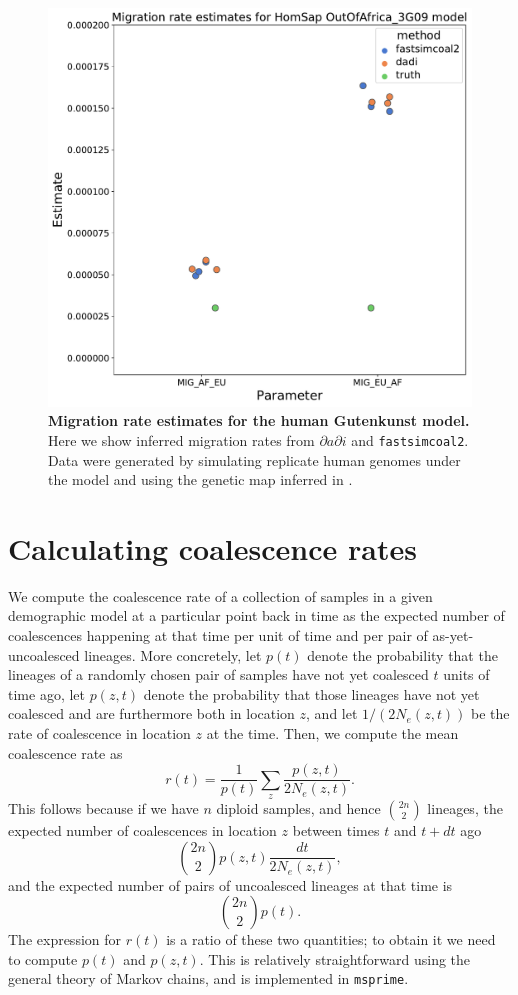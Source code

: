 \documentclass[12pt,halfline,a4paper]{ouparticle}
\newcommand{\stopsupplement}{%
        \setcounter{table}{0}
        \renewcommand{\thetable}{\arabic{table}}%
        \setcounter{figure}{0}
        \renewcommand{\thefigure}{\arabic{figure}}%
     }
\newcommand{\dadi}{$\partial a \partial i$\xspace}
\newcommand{\fastsimcoal}{\texttt{fastsimcoal2}\xspace}
\begin{document}
\begin{figure}
\begin{center}
\includegraphics[width=0.8\linewidth]{display_items/homsap_migration_rates.pdf}
\caption{\textbf{Migration rate estimates for the human Gutenkunst model.}
Here we show inferred migration rates from \dadi and \fastsimcoal.
Data were generated by simulating
replicate human genomes under the \cite{gutenkunst2009inferring} model and using the genetic map
inferred in \cite{international2007second}.}
\label{fig:homsap_mig_rates}
\end{center}
\end{figure}


\stopsupplement

\appendix

\section*{Calculating coalescence rates}

We compute the coalescence rate of a collection of samples in a given demographic model
at a particular point back in time
as the expected number of coalescences happening at that time
per unit of time and per pair of as-yet-uncoalesced lineages.
More concretely,
let $p(t)$ denote the probability that the lineages of a randomly chosen pair of samples
have not yet coalesced $t$ units of time ago,
let $p(z, t)$ denote the probability that those lineages have not yet coalesced
and are furthermore both in location $z$,
and let $1/(2 N_e(z,t))$ be the rate of coalescence in location $z$ at the time.
Then, we compute the mean coalescence rate as
$$  r(t)  = \frac{1}{p(t)} \sum_z \frac{p(z,t)}{2N_e(z,t)} . $$
This follows because if we have $n$ diploid samples, and hence $\binom{2n}{2}$ lineages,
the expected number of coalescences in location $z$ between times $t$ and $t+dt$ ago
$$
\binom{2n}{2} p(z,t) \frac{ dt }{ 2 N_e(z,t) },
$$
and the expected number of pairs of uncoalesced lineages at that time is
$$
\binom{2n}{2} p(t) .
$$
The expression for $r(t)$ is a ratio of these two quantities;
to obtain it we need to compute $p(t)$ and $p(z,t)$.
This is relatively straightforward
using the general theory of Markov chains, and is implemented in \texttt{msprime}.
\end{document}
